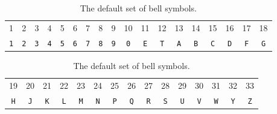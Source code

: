 \documentclass[a4paper,11pt,oneside]{book}
\begin{document}

\begin{table}[h]\centering
{\footnotesize\begin{tabular}{cccccccccc cccccccc}
1&2&3&4&5&6&7&8&9&10&11&12&13&14&15&16&17&18\\
\texttt{1}&\texttt{2}&\texttt{3}&\texttt{4}&\texttt{5}&\texttt{6}&\texttt{7}&\texttt{8}&\texttt{9}&\texttt{0}&\texttt{E}&\texttt{T}&\texttt{A}&\texttt{B}&\texttt{C}&\texttt{D}&\texttt{F}&\texttt{G}\\
\end{tabular}}
\caption*{}
{\footnotesize\begin{tabular}{cc cccccccccc ccc}
19&20&21&22&23&24&25&26&27&28&29&30&31&32&33\\
\texttt{H}&\texttt{J}&\texttt{K}&\texttt{L}&\texttt{M}&\texttt{N}&\texttt{P}&\texttt{Q}&\texttt{R}&\texttt{S}&\texttt{U}&\texttt{V}&\texttt{W}&\texttt{Y}&\texttt{Z}\\
\end{tabular}}
\caption{\label{tab:bellsym}The default set of bell symbols.}
\end{table}
\end{document}
